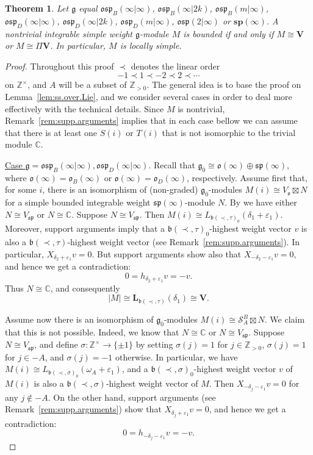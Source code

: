 \documentclass[12pt]{amsart}
\newcommand\C{\mathbb{C}}
\newcommand\Z{\mathbb{Z}}
\newcommand\g{\mathfrak{g}}
\newcommand\fb{\mathfrak{b}}
\newcommand\fsp{\mathfrak{sp}}
\newcommand\fosp{\mathfrak{osp}}
\newcommand\fo{\mathfrak{o}}
\newcommand\cS{\mathcal{S}}
\newcommand\bV{\mathbf{V}}
\newcommand\bsp{\mathbf{sp}}
\newcommand\bL{\mathbf{L}}
\theoremstyle{plain}
\newtheorem{theo}{Theorem}[section]
\theoremstyle{definition}
\numberwithin{equation}{section}
\begin{document}
\begin{theo}\label{thm:classification.BCDp}
Let $\g$ equal $\fosp_B(\infty|\infty)$, $\fosp_B(\infty|2k)$, $\fosp_B(m|\infty)$, $\fosp_D(\infty|\infty)$, $\fosp_D(\infty|2k)$, $\fosp_D(m|\infty)$, $\fosp(2|\infty)$ or $\bsp(\infty)$. A nontrivial integrable simple weight $\g$-module $M$ is bounded if and only if $M\cong \bV$ or $M\cong \Pi \bV$. In particular, $M$ is locally simple.
\end{theo}
\begin{proof}
Throughout this proof $\prec$ denotes the linear order 
	\[
-1\prec 1\prec -2\prec 2\prec \cdots
	\]
on $\Z^\times $, and $A$ will be a subset of $\Z_{>0}$. The general idea is to base the proof on Lemma~\ref{lem:ss.over.Lie}, and we consider several cases in order to deal more effectively with the technical details. Since $M$ is nontrivial, Remark~\ref{rem:supp.arguments} implies that in each case bellow we can assume that there is at least one $S(i)$ or $T(i)$ that is not isomorphic to the trivial module $\C$.

\underline{Case $\g = \fosp_B(\infty|\infty), \fosp_D(\infty|\infty)$}. Recall that $\g_{\bar 0} \cong \fo(\infty)\oplus \fsp(\infty)$, where $\fo(\infty) = \fo_B(\infty)$ or $\fo(\infty) = \fo_D(\infty)$, respectively. Assume first that, for some $i$, there is an isomorphism of (non-graded) $\g_{\bar 0}$-modules $M(i)\cong V_\fo \boxtimes N$ for a simple bounded integrable weight $\fsp(\infty)$-module $N$. By  \cite[Proposition~5.7]{GP20} we have either $N \cong V_\fsp$ or $N\cong \C$. Suppose $N \cong V_\fsp$. Then $M(i)\cong L_{\fb(\prec,\tau)_0}(\delta_1 + \varepsilon_1)$. Moreover, support arguments imply that a $\fb(\prec,\tau)_0$-highest weight vector $v$ is also a $\fb(\prec,\tau)$-highest weight vector (see Remark~\ref{rem:supp.arguments}). In particular, $X_{\delta_2 + \varepsilon_1} v=0$.  But support arguments show also that $X_{-\delta_2 - \varepsilon_1} v=0$, and hence we get a contradiction:
	\[
0=h_{\delta_2+\varepsilon_1}v = -v.
	\]
Thus $N\cong \C$, and consequently
	\[
|M|\cong \bL_{\fb(\prec,\tau)}(\delta_1)\cong \bV.
	\]

Assume now there is an isomorphism of $\g_{\bar 0}$-modules $M(i)\cong \cS_A^B\boxtimes N$. We claim that this is not possible. Indeed, we know that $N\cong \C$ or $N\cong V_\fsp$. Suppose $N \cong V_\fsp$, and define $\sigma: \Z^\times \to \{\pm 1\}$ by setting $\sigma(j)=1$ for $j\in \Z_{>0}$, $\sigma(j)=1$ for $j\in -A$, and $\sigma(j)=-1$ otherwise. In particular, we have $M(i)\cong L_{\fb(\prec,\sigma)_0}(\omega_A + \varepsilon_1)$, and a $\fb(\prec,\sigma)_0$-highest weight vector $v$ of $M(i)$ is also a $\fb(\prec,\sigma)$-highest weight vector of $M$. Then $X_{-\delta_j - \varepsilon_1} v=0$ for any $j\notin -A$.  On the other hand, support arguments (see Remark~\ref{rem:supp.arguments}) show that $X_{\delta_j + \varepsilon_1} v=0$, and hence we get a contradiction:
	\[
0=h_{-\delta_j-\varepsilon_1}v = -v.
	\]


\end{proof}
\end{document}
